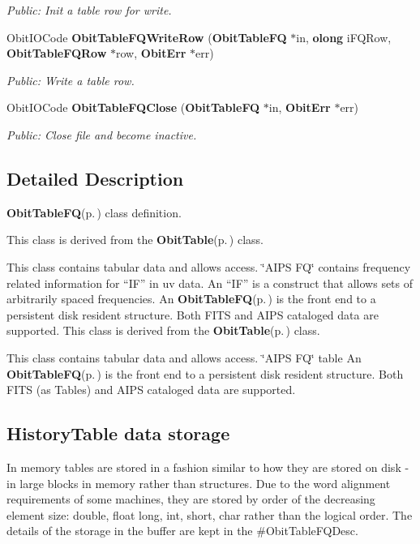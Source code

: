 \begin{CompactItemize}
\begin{CompactList}\small\item\em Public: Init a table row for write. \item\end{CompactList}\item 
Obit\-IOCode {\bf Obit\-Table\-FQWrite\-Row} ({\bf Obit\-Table\-FQ} $\ast$in, {\bf olong} i\-FQRow, {\bf Obit\-Table\-FQRow} $\ast$row, {\bf Obit\-Err} $\ast$err)
\begin{CompactList}\small\item\em Public: Write a table row. \item\end{CompactList}\item 
Obit\-IOCode {\bf Obit\-Table\-FQClose} ({\bf Obit\-Table\-FQ} $\ast$in, {\bf Obit\-Err} $\ast$err)
\begin{CompactList}\small\item\em Public: Close file and become inactive. \item\end{CompactList}\end{CompactItemize}


\subsection{Detailed Description}
{\bf Obit\-Table\-FQ}{\rm (p.\,\pageref{structObitTableFQ})} class definition. 

This class is derived from the {\bf Obit\-Table}{\rm (p.\,\pageref{structObitTable})} class.

This class contains tabular data and allows access. \char`\"{}AIPS FQ\char`\"{} contains frequency related information for ``IF'' in uv data. An ``IF'' is a construct that allows sets of arbitrarily spaced frequencies. An {\bf Obit\-Table\-FQ}{\rm (p.\,\pageref{structObitTableFQ})} is the front end to a persistent disk resident structure. Both FITS and AIPS cataloged data are supported. This class is derived from the {\bf Obit\-Table}{\rm (p.\,\pageref{structObitTable})} class.

This class contains tabular data and allows access. \char`\"{}AIPS FQ\char`\"{} table An {\bf Obit\-Table\-FQ}{\rm (p.\,\pageref{structObitTableFQ})} is the front end to a persistent disk resident structure. Both FITS (as Tables) and AIPS cataloged data are supported.\subsection{History\-Table data storage}\label{ObitTableWX_8h_TableDataStorage}
In memory tables are stored in a fashion similar to how they are stored on disk - in large blocks in memory rather than structures. Due to the word alignment requirements of some machines, they are stored by order of the decreasing element size: double, float long, int, short, char rather than the logical order. The details of the storage in the buffer are kept in the \#Obit\-Table\-FQDesc.

